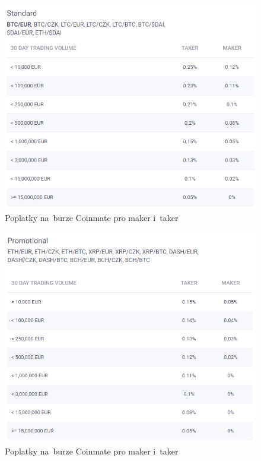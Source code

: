 \documentclass[thesis=B,czech]{FITthesis}[2019/03/21]
\begin{document}
\begin{figure}[h]\centering
	\includegraphics[width=1\textwidth]{images/coinmate_standard.PNG}
	\caption{Poplatky na~burze Coinmate pro maker i~taker \cite{coinmate_fees}}\label{coinmate_standard}
\end{figure}
\begin{figure}[H]\centering
	\includegraphics[width=1\textwidth]{images/coinmate_promotional.PNG}
	\caption{Poplatky na~burze Coinmate pro maker i~taker \cite{coinmate_fees}}\label{coinmate_promotional}
\end{figure}
\end{document}
